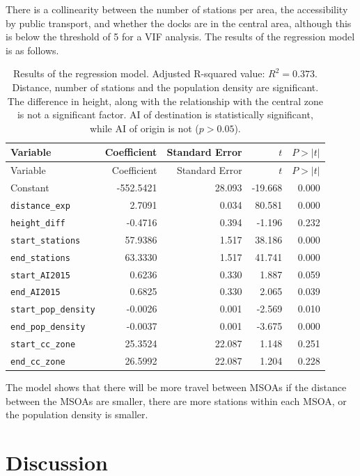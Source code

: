\documentclass[
  12pt,
  a4paper,
  DIV=11,
  numbers=noendperiod]{scrartcl}
\begin{document}
There is a collinearity between the number of stations per area, the
accessibility by public transport, and whether the docks are in the
central area, although this is below the threshold of 5 for a VIF
analysis. The results of the regression model is as follows.

\begin{longtable}[]{@{}lrrrr@{}}
\caption{Results of the regression model. Adjusted R-squared value:
\(R^2 = 0.373\). Distance, number of stations and the population density
are significant. The difference in height, along with the relationship
with the central zone is not a significant factor. AI of destination is
statistically significant, while AI of origin is not
(\(p > 0.05\)).}\tabularnewline
\toprule\noalign{}
Variable & Coefficient & Standard Error & \(t\) & \(P > |t|\) \\
\midrule\noalign{}
\endfirsthead
\toprule\noalign{}
Variable & Coefficient & Standard Error & \(t\) & \(P > |t|\) \\
\midrule\noalign{}
\endhead
\bottomrule\noalign{}
\endlastfoot
Constant & -552.5421 & 28.093 & -19.668 & 0.000 \\
\texttt{distance\_exp} & 2.7091 & 0.034 & 80.581 & 0.000 \\
\texttt{height\_diff} & -0.4716 & 0.394 & -1.196 & 0.232 \\
\texttt{start\_stations} & 57.9386 & 1.517 & 38.186 & 0.000 \\
\texttt{end\_stations} & 63.3330 & 1.517 & 41.741 & 0.000 \\
\texttt{start\_AI2015} & 0.6236 & 0.330 & 1.887 & 0.059 \\
\texttt{end\_AI2015} & 0.6825 & 0.330 & 2.065 & 0.039 \\
\texttt{start\_pop\_density} & -0.0026 & 0.001 & -2.569 & 0.010 \\
\texttt{end\_pop\_density} & -0.0037 & 0.001 & -3.675 & 0.000 \\
\texttt{start\_cc\_zone} & 25.3524 & 22.087 & 1.148 & 0.251 \\
\texttt{end\_cc\_zone} & 26.5992 & 22.087 & 1.204 & 0.228 \\
\end{longtable}

The model shows that there will be more travel between MSOAs if the
distance between the MSOAs are smaller, there are more stations within
each MSOA, or the population density is smaller.

\hypertarget{discussion}{%
\section{Discussion}\label{discussion}}
\end{document}
